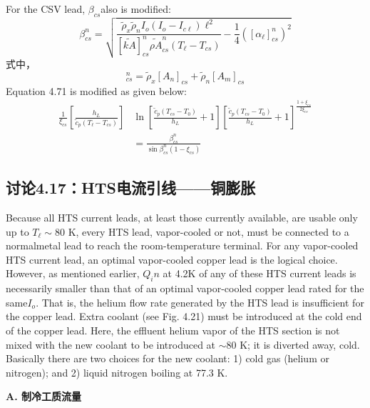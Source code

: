For the CSV lead, $\beta_{cs}$also is modified:
\begin{equation}%
\beta_{cs}^{n}=\sqrt{\frac{\tilde{\rho}_x\tilde{\rho}_nI_o(I_o-I_{c\ell})\ell^2}{[\tilde{kA}]_{cs}^{n}\tilde{\rho A}_{cs}^{n}(T_\ell-T_{cs})}-\frac{1}{4}([\alpha_\ell]_{cs}^{n})^2}
\end{equation}
式中，
\begin{equation}%
[\tilde{\rho A}]_{cs}^{n}=\tilde{\rho}_x[A_n]_{cs}+\tilde{\rho}_n[A_m]_{cs}
\end{equation}
Equation 4.71 is modified as given below:
\begin{align}%
\frac{1}{\xi_{cs}}\left[\frac{h_L}{\tilde{c}_p(T_\ell-T_{cs})}\right]&\ln\left[\frac{\tilde{c}_p(T_{cs}-T_0)}{h_L}+1\right]\left[\frac{\tilde{c}_p(T_{cs}-T_0)}{h_L}+1\right]^{\frac{1+\xi_{cs}}{2\xi_{cs}}}\\
&=\frac{\beta_{cs}^{n}}{\sin\beta_{cs}^{n}(1-\xi_{cs})}
\end{align}



\subsection{讨论4.17：HTS电流引线——铜膨胀}
Because all HTS current leads, at least those currently available, are usable only up
to $T_\ell\sim$80 K, every HTS lead, vapor-cooled or not, must be connected to a normalmetal
lead to reach the room-temperature terminal. For any vapor-cooled HTS
current lead, an optimal vapor-cooled copper lead is the logical choice. However,
as mentioned earlier, $Q_in$ at 4.2K of any of these HTS current leads is necessarily
smaller than that of an optimal vapor-cooled copper lead rated for the same$I_o$.
That is, the helium flow rate generated by the HTS lead is insufficient for the
copper lead. Extra coolant (see Fig. 4.21) must be introduced at the cold end of
the copper lead. Here, the effluent helium vapor of the HTS section is not mixed
with the new coolant to be introduced at $\sim$80 K; it is diverted away, cold. Basically
there are two choices for the new coolant: 1) cold gas (helium or nitrogen); and
2) liquid nitrogen boiling at 77.3 K.

\textbf{A. 制冷工质流量}

